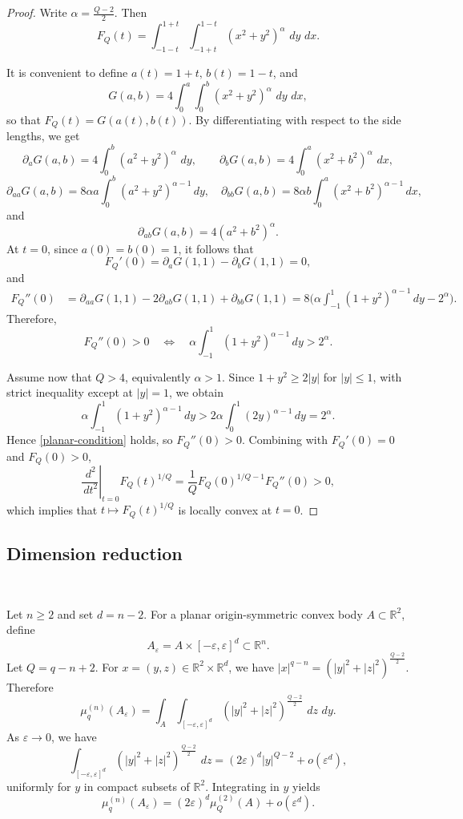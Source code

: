 \documentclass[12pt,leqno]{amsart}
\theoremstyle{plain} \newtheorem{thm}{Theorem}[section]
\theoremstyle{plain} \newtheorem{prop}[thm]{Proposition}
\theoremstyle{plain} \newtheorem{prob}[thm]{Problem}
\theoremstyle{definition} \newtheorem{defi}[thm]{Definition}
\theoremstyle{plain} \newtheorem{cor}[thm]{Corollary}
\theoremstyle{plain} \newtheorem{lem}[thm]{Lemma}
\theoremstyle{plain} \newtheorem{eg}{Example}[section]
\theoremstyle{remark} \newtheorem{rmk}[thm]{Remark}
\theoremstyle{plain} \newtheorem{conj}{Conjecture}
\numberwithin{equation}{section}
\newcommand{\dd}{\,d}
\newcommand{\R}{\mathbb{R}}
\begin{document}
\begin{proof}
Write $\alpha=\frac{Q-2}{2}$. Then
\[
    F_Q(t)=\int_{-1-t}^{1+t}\int_{-1+t}^{1-t}(x^2+y^2)^\alpha\,\dd y\,\dd x.
\]

It is convenient to define $a(t)=1+t,\, b(t)=1-t$, and
\[
    G(a,b)=4\int_0^a\int_0^b (x^2+y^2)^\alpha\,\dd y\,\dd x,
\]
so that $F_Q(t)=G(a(t),b(t))$. By differentiating with respect to the side lengths, we get
\[
    \partial_a G(a,b)=4\int_0^b (a^2+y^2)^\alpha\,\dd y,\qquad
    \partial_b G(a,b)=4\int_0^a (x^2+b^2)^\alpha\,\dd x,
\]
\[
    \partial_{aa}G(a,b)=8\alpha a\int_0^b(a^2+y^2)^{\alpha-1}\dd y,\quad
    \partial_{bb}G(a,b)=8\alpha b\int_0^a(x^2+b^2)^{\alpha-1}\dd x,
\]
and
\[
    \partial_{ab}G(a,b)=4(a^2+b^2)^\alpha.
\]
At $t=0$, since $a(0)=b(0)=1$, it follows that
\[
     F_Q'(0)=\partial_aG(1,1)-\partial_bG(1,1)=0,
\]
and
\begin{align*}
    F_Q''(0)
    &=\partial_{aa}G(1,1)-2\partial_{ab}G(1,1)+\partial_{bb}G(1,1)
    = 8\Big(\alpha\int_{-1}^1(1+y^2)^{\alpha-1}\dd y-2^\alpha\Big).
\end{align*}
Therefore,
\begin{equation}\label{planar-condition}
    F_Q''(0)>0
    \quad\Longleftrightarrow\quad
    \alpha\int_{-1}^1(1+y^2)^{\alpha-1}\dd y>2^\alpha.
\end{equation}

Assume now that $Q>4$, equivalently $\alpha>1$. Since $1+y^2\ge 2|y|$ for $|y|\le 1$, with strict inequality except at $|y|=1$, we obtain
\[
    \alpha\int_{-1}^1(1+y^2)^{\alpha-1}\dd y
    >2\alpha\int_0^1(2y)^{\alpha-1}\dd y
    =2^\alpha.
\]
Hence \eqref{planar-condition} holds, so $F_Q''(0)>0$.
Combining with $F_Q'(0)=0$ and $F_Q(0)>0$,
\[
    \left.\frac{\dd^2}{\dd t^2}\right|_{t=0}F_Q(t)^{1/Q}
    =\frac{1}{Q}F_Q(0)^{1/Q-1}F_Q''(0)>0,
\]
which implies that $t\mapsto F_Q(t)^{1/Q}$ is locally convex at $t=0$.
\end{proof}

\subsection{Dimension reduction}\

Let $n\ge2$ and set $d=n-2$. For a planar origin-symmetric convex body $A\subset\R^2$, define
\[
    A_\varepsilon=A\times[-\varepsilon,\varepsilon]^d\subset\R^n.
\]
Let $ Q=q-n+2$. For $x=(y,z)\in\R^2\times\R^d$, we have $|x|^{q-n}=(|y|^2+|z|^2)^{\frac{Q-2}{2}}.$
Therefore
\[
    \mu_q^{(n)}(A_\varepsilon)
    =\int_A\int_{[-\varepsilon,\varepsilon]^d}(|y|^2+|z|^2)^{\frac{Q-2}{2}}\,\dd z\,\dd y.
\]
As $\varepsilon\to 0$, we have
\[
    \int_{[-\varepsilon,\varepsilon]^d}(|y|^2+|z|^2)^{\frac{Q-2}{2}}\,\dd z
    =(2\varepsilon)^d|y|^{Q-2}+o(\varepsilon^d),
\]
uniformly for $y$ in compact subsets of $\R^2$. Integrating in $y$ yields
\begin{equation}\label{dimension-reduction}
    \mu_q^{(n)}(A_\varepsilon)
    =(2\varepsilon)^d\mu_Q^{(2)}(A)+o(\varepsilon^d).
\end{equation}
\end{document}
